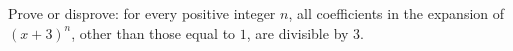 Prove or disprove: for every positive integer $n$, all coefficients in the expansion of $(x+3)^n$, other than those equal to $1$, are divisible by $3$.
